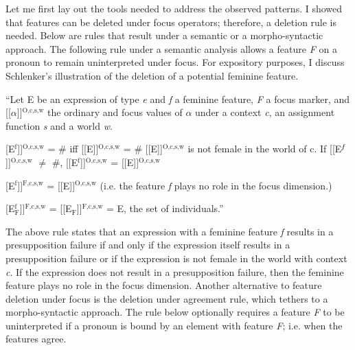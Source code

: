 \documentclass[output=paper,
modfonts
]{langscibook}
\begin{document}
Let me first lay out the tools needed to address the observed patterns. I showed that features can be deleted under focus operators; therefore, a deletion rule is needed. Below are rules that result under a semantic or a morpho-syntactic approach. The following rule under a semantic analysis allows a feature \textit{F} on a pronoun to remain uninterpreted under focus. For expository purposes, I discuss Schlenker's illustration of the deletion of a potential feminine feature.  

\begin{exe}
	\ex \label{ex:irani:74}``Let E be an expression of type \textit{e} and \textit{f} a feminine feature, \textit{F} a focus marker, and {[}[\(\alpha\){]}]$^\text{{O,c,s,w}}$ the ordinary and focus values of \(\alpha\) under a context \textit{c}, an assignment function \textit{s} and a world \textit{w}.
	
	\begin{xlist}
		\ex {[}[E$^\text{{f}}${]}]$^\text{{O,c,s,w}}$ = \# iff {[}[E{]}]$^\text{{O,c,s,w}}$ = \# {[}[E{]}]$^\text{{O,c,s,w}}$ is not female in the world of c. If {[}[E$^\text{\textit{f}}${]}]$^\text{{O,c,s,w}}$ \(\neq\) \#, {[}[E$^\text{{f}}${]}]$^\text{{O,c,s,w}}$ = {[}[E{]}]$^\text{{O,c,s,w}}$
		
		\ex {[}[E$^\text{{f}}${]}]$^\text{{F,c,s,w}}$ = {[}[E{]}]$^\text{{O,c,s,w}}$ (i.e. the feature \textit{f} plays no role in the focus dimension.)
		
		\ex {[}[E$^\text{{f}}_\text{{F}}${]}]$^\text{{F,c,s,w}}$ = {[}[E$_\text{{F}}${]}]$^\text{{F,c,s,w}}$ = E, the set of individuals.'' \citep[1070]{Schlenker2014}
	\end{xlist}
	
\end{exe}

The above rule states that an expression with a feminine feature \textit{f} results in a presupposition failure if and only if the expression itself results in a presupposition failure or if the expression is not female in the world with context \textit{c}. If the expression does not result in a presupposition failure, then the feminine feature plays no role in the focus dimension. Another alternative to feature deletion under focus is the deletion under agreement rule, which tethers to a morpho-syntactic approach. The rule below optionally requires a feature \textit{F} to be uninterpreted if a pronoun is bound by an element with feature \textit{F}; i.e. when the features agree.
\end{document}
